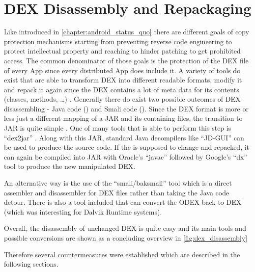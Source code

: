 


\section{DEX Disassembly and Repackaging}
Like introduced in \autoref{chapter:android_status_quo} there
are different goals of copy protection mechanisms starting from
preventing reverse code engineering to protect intellectual property
and reaching to hinder patching to get prohibited access.
The common denominator of those goals is the protection of
the DEX file of every App since every distributed App does include
it. A variety of tools do exist that
are able to transform DEX into different readable formats,
modify it and repack it again since the DEX contains
a lot of meta data for its contents (classes, methods, \ldots)
\parencite{dex}.
Generally there do exist two possible outcomes of DEX disassembling
- Java code () and Smali code ().
Since the DEX format is more or less just a different mapping of a
JAR and its containing  files, the transition to JAR
is quite simple \parencite{dvminternals}. One of many tools that is able to
perform this step is ``dex2jar'' \parencite{dex2jartool}.
Along with this JAR, standard Java decompilers like ``JD-GUI''
\parencite{jdtool} can be used to produce the  source code.
If the  is supposed to change and repacked, it can
again be compiled into JAR with Oracle's ``javac'' \parencite{javactool}
followed by Google's ``dx'' tool \parencite{dxtool}
to produce the new manipulated DEX.

An alternative way is the use of the ``smali/baksmali'' tool
\parencite{smalitool} which is a direct assembler and disassembler
for DEX files rather than taking the Java code detour. There is also
a tool included that can convert the ODEX back to DEX (which was interesting
for Dalvik Runtime systems).

Overall, the disassembly of unchanged DEX is quite easy and
its main tools and possible conversions are shown
as a concluding overview in \autoref{fig:dex_disassembly}

Therefore several countermeasures were established which are
described in the following sections.


